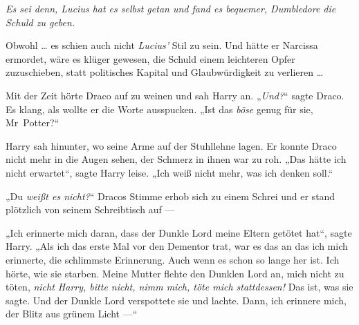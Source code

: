\emph{Es sei denn, Lucius hat es selbst getan und fand es bequemer, Dumbledore die Schuld zu geben.}

Obwohl … es schien auch nicht \emph{Lucius’} Stil zu sein. Und hätte er Narcissa ermordet, wäre es klüger gewesen, die Schuld einem leichteren Opfer zuzuschieben, statt politisches Kapital und Glaubwürdigkeit zu verlieren …

Mit der Zeit hörte Draco auf zu weinen und sah Harry an.
„\emph{Und?}“ sagte Draco. Es klang, als wollte er die Worte ausspucken.
„Ist das \emph{böse} genug für sie, Mr~Potter?“

Harry sah hinunter, wo seine Arme auf der Stuhllehne lagen. Er konnte Draco nicht mehr in die Augen sehen, der Schmerz in ihnen war zu roh.
„Das hätte ich nicht erwartet“, sagte Harry leise.
„Ich weiß nicht mehr, was ich denken soll.“

„Du \emph{weißt es nicht?}“ Dracos Stimme erhob sich zu einem Schrei und er stand plötzlich von seinem Schreibtisch auf —

„Ich erinnerte mich daran, dass der Dunkle Lord meine Eltern getötet hat“, sagte Harry.
„Als ich das erste Mal vor den Dementor trat, war es das an das ich mich erinnerte, die schlimmste Erinnerung. Auch wenn es schon so lange her ist. Ich hörte, wie sie starben. Meine Mutter flehte den Dunklen Lord an, mich nicht zu töten, \emph{nicht Harry, bitte nicht, nimm mich, töte mich stattdessen!} Das ist, was sie sagte. Und der Dunkle Lord verspottete sie und lachte. Dann, ich erinnere mich, der Blitz aus grünem Licht —“


